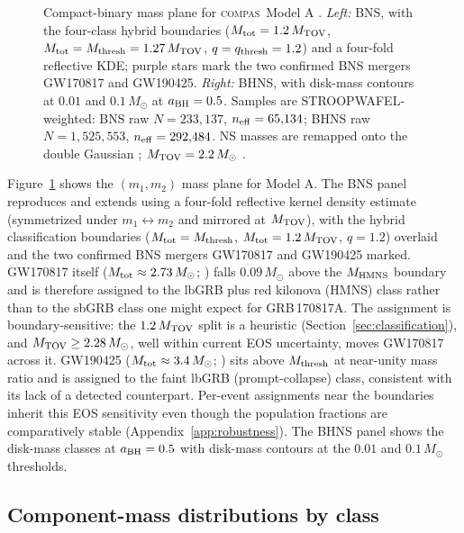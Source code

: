 \documentclass[twocolumn,amsmath]{aastex702}
\newcommand{\Msun}{M_\odot}
\newcommand{\Mtov}{M_{\rm TOV}}
\newcommand{\Mthresh}{M_{\rm thresh}}
\newcommand{\Mtot}{M_{\rm tot}}
\newcommand{\compas}{\textsc{compas}}
\newcommand{\aBH}{a_{\rm BH}}
\begin{document}
\begin{figure}[tbp]
\caption{Compact-binary mass plane for \compas\ Model A
\citep[Zenodo 5189849 and 5178777]{broekgaarden2021}. \textit{Left:} BNS, with the
\citet{gottlieb2024} four-class hybrid boundaries ($\Mtot = 1.2\,\Mtov$,
$\Mtot = \Mthresh = 1.27\,\Mtov$, $q = q_{\rm thresh} = 1.2$) and a four-fold
reflective KDE; purple stars mark the two confirmed BNS mergers GW170817 and
GW190425. \textit{Right:} BHNS, with
\citet{foucart2018} disk-mass contours at $0.01$ and $0.1\,\Msun$ at
$\aBH = 0.5$. Samples are STROOPWAFEL-weighted: BNS raw $N = 233{,}137$,
$n_{\rm eff} = 65{,}134$; BHNS raw $N = 1{,}525{,}553$, $n_{\rm eff} = 292{,}484$.
NS masses are remapped onto the \citet{alsing2018} double Gaussian
\citep{mandel2020}; $\Mtov = 2.2\,\Msun$ \citep{raaijmakers2021}.
\label{fig:massplane}}
\end{figure}

Figure~\ref{fig:massplane} shows the $(m_1, m_2)$ mass plane for Model A. The BNS
panel reproduces and extends \citet[their Fig.~3]{gottlieb2024} using a
four-fold reflective kernel density estimate (symmetrized under
$m_1 \leftrightarrow m_2$ and mirrored at $\Mtov$), with the hybrid classification
boundaries ($\Mtot = \Mthresh$, $\Mtot = 1.2\,\Mtov$, $q = 1.2$) overlaid and the
two confirmed BNS mergers GW170817 and GW190425 marked. GW170817 itself
($\Mtot \approx 2.73\,\Msun$; \citealt{abbott2019gw170817}) falls
$0.09\,\Msun$ above the $M_{\rm HMNS}$ boundary and is therefore assigned to
the lbGRB plus red kilonova (HMNS) class rather than to the sbGRB class one
might expect for GRB\,170817A. The assignment is boundary-sensitive: the
$1.2\,\Mtov$ split is a heuristic (Section~\ref{sec:classification}), and
$\Mtov \geq 2.28\,\Msun$, well within current EOS uncertainty, moves GW170817
across it. GW190425 ($\Mtot \approx 3.4\,\Msun$;
\citealt{abbott2020gw190425}) sits above $\Mthresh$ at near-unity mass ratio
and is assigned to the faint lbGRB (prompt-collapse) class, consistent with
its lack of a detected counterpart. Per-event assignments near the boundaries
inherit this EOS sensitivity even though the population fractions are
comparatively stable (Appendix~\ref{app:robustness}). The BHNS panel shows the
disk-mass classes at $\aBH = 0.5$ with \citet{foucart2018} disk-mass contours at
the $0.01$ and $0.1\,\Msun$ thresholds.

\subsection{Component-mass distributions by class} \label{sec:massdist}
\end{document}

